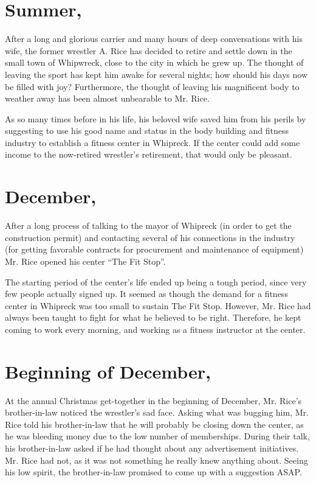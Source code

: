 \documentclass[11pt]{article}
\begin{document}
\maketitle

\section*{Summer, \the\numexpr\the{}\relax}
After a long and glorious carrier and many hours of deep conversations with his wife, the former wrestler A. Rice has  decided to retire and settle down in the small town of Whipwreck, close to the city in which he grew up.
%
The thought of leaving the sport has kept him awake for several nights; how should his days now be filled with joy? Furthermore, the thought of leaving his magnificent body to weather away has been almost unbearable to Mr. Rice.

As so many times before in his life, his beloved wife saved him from his perils by suggesting to use his good name and status in the body building and fitness industry to establish a fitness center in Whipreck. If the center could add some income to the now-retired wrestler's retirement, that would only be pleasant.

\section*{December, \the\numexpr\the{}\relax}
After a long process of talking to the mayor of Whipreck (in order to get the construction permit) and contacting several of his connections in the industry (for getting favorable contracts for procurement and maintenance of equipment) Mr. Rice opened his center ``The Fit Stop''.

The starting period of the center's life ended up being a tough period, since very few people actually signed up. It seemed as though the demand for a fitness center in Whipreck was too small to sustain The Fit Stop. However, Mr. Rice had always been taught to fight for what he believed to be right. Therefore, he kept coming to work every morning, and working as a fitness instructor at the center.

\section*{Beginning of December, \the\numexpr\the{}\relax}
At the annual Christmas get-together in the beginning of December, Mr. Rice's brother-in-law noticed the wrestler's sad face. Asking what was bugging him, Mr. Rice told his brother-in-law that he will probably be closing down the center, as he was bleeding money due to the low number of memberships. During their talk, his brother-in-law asked if he had thought about any advertisement initiatives. Mr. Rice had not, as it was not something he really knew anything about. Seeing his low spirit, the brother-in-law promised to come up with a suggestion ASAP.
\end{document}
